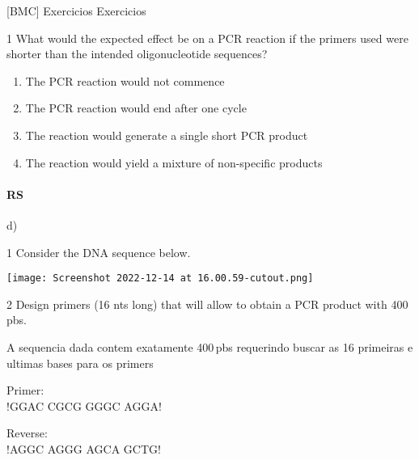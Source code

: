 \documentclass[\mainfilename]{subfiles}
\begin{document}
\renewcommand\theenumi{\alph{enumi}}

[BMC]
{Exercicios}
{Exercicios}

\begin{questionBox}1{ %
    What would the expected effect be on a PCR reaction if the primers used were shorter than the intended oligonucleotide sequences?
} %
    \begin{enumerate}[label=\alph{enumi})]
        \item The PCR reaction would not commence
        \item The PCR reaction would end after one cycle
        \item The reaction would generate a single short PCR product
        \item The reaction would yield a mixture of non-specific products
    \end{enumerate}

    \paragraph*{RS} d)

\end{questionBox}

\begin{questionBox}1{ %
    Consider the DNA sequence below.
} %
    \begin{center}
        \texttt{[image: Screenshot 2022-12-14 at 16.00.59-cutout.png]}
    \end{center}

\end{questionBox}

\begin{questionBox}2{ %
    Design primers (16 nts long) that will allow to obtain a PCR product with 400 pbs.
} %

    A sequencia dada contem exatamente 400\,pbs requerindo buscar as 16 primeiras e ultimas bases para os primers\\

    \begin{multicols}{2}
        \renewcommand\DNAblock{4}

        Primer:\\
        \DNA!GGAC CGCG GGGC AGGA!

        Reverse:\\
        \DNA!AGGC AGGG AGCA GCTG!
    \end{multicols}
\end{questionBox}
\end{document}
